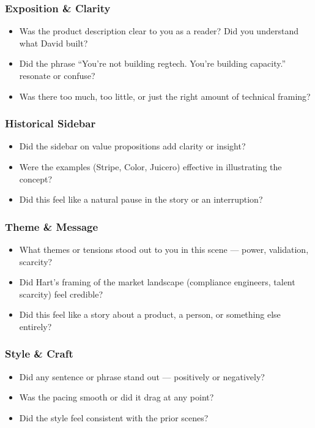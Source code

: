 \subsubsection{Exposition \& Clarity}

\begin{itemize}
  \item Was the product description clear to you as a reader? Did you understand what David built?
  \item Did the phrase “You’re not building regtech. You’re building capacity.” resonate or confuse?
  \item Was there too much, too little, or just the right amount of technical framing?
\end{itemize}

\subsubsection{Historical Sidebar}

\begin{itemize}
  \item Did the sidebar on value propositions add clarity or insight?
  \item Were the examples (Stripe, Color, Juicero) effective in illustrating the concept?
  \item Did this feel like a natural pause in the story or an interruption?
\end{itemize}

\subsubsection{Theme \& Message}

\begin{itemize}
  \item What themes or tensions stood out to you in this scene — power, validation, scarcity?
  \item Did Hart’s framing of the market landscape (compliance engineers, talent scarcity) feel credible?
  \item Did this feel like a story about a product, a person, or something else entirely?
\end{itemize}

\subsubsection{Style \& Craft}

\begin{itemize}
  \item Did any sentence or phrase stand out — positively or negatively?
  \item Was the pacing smooth or did it drag at any point?
  \item Did the style feel consistent with the prior scenes?
\end{itemize}

